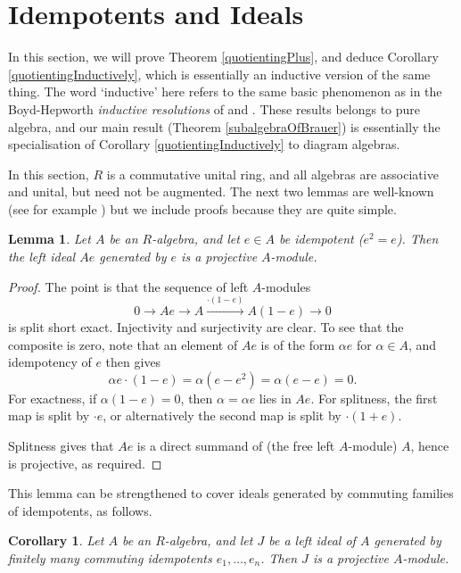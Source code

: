 \documentclass[12pt]{amsart}
\theoremstyle{plain}
\theoremstyle{definition} \newtheorem{definition}[theorem]{Definition}
\theoremstyle{plain}
\newtheorem{lemma}[theorem]{Lemma}
\theoremstyle{plain} \newtheorem{proposition}[theorem]{Proposition}
\theoremstyle{plain} \newtheorem{conjecture}[theorem]{Conjecture}
\theoremstyle{plain} \newtheorem{corollary}[theorem]{Corollary}
\theoremstyle{remark} \newtheorem{claim}[theorem]{Claim}
\theoremstyle{remark} \newtheorem{remark}[theorem]{Remark}
\theoremstyle{remark} \newtheorem{example}[theorem]{Example}
\theoremstyle{remark} \newtheorem{comment}[theorem]{Comment}
\theoremstyle{definition} \newtheorem{question}[theorem]{Question}
\begin{document}
\section{Idempotents and Ideals} \label{SectionIdempotents}

In this section, we will prove Theorem \ref{quotientingPlus}, and deduce Corollary \ref{quotientingInductively}, which is essentially an inductive version of the same thing. The word `inductive' here refers to the same basic phenomenon as in the Boyd-Hepworth \emph{inductive resolutions} of \cite{BH} and \cite{BHP}. These results belongs to pure algebra, and our main result (Theorem \ref{subalgebraOfBrauer}) is essentially the specialisation of Corollary \ref{quotientingInductively} to diagram algebras.

In this section, $R$ is a commutative unital ring, and all algebras are associative and unital, but need not be augmented. The next two lemmas are well-known (see for example \cite[Chapter 1, Exercise 2.4]{Liu}) but we include proofs because they are quite simple.

\begin{lemma} Let $A$ be an $R$-algebra, and let $e \in A$ be idempotent ($e^2=e$). Then the left ideal $A e$ generated by $e$ is a projective $A$-module. \label{singleIdempotent} \end{lemma} 

\begin{proof} The point is that the sequence of left $A$-modules $$0 \to Ae \to A \xrightarrow{\cdot(1-e)} A(1-e) \to 0$$ is split short exact. Injectivity and surjectivity are clear. To see that the composite is zero, note that an element of $Ae$ is of the form $\alpha e$ for $\alpha \in A$, and idempotency of $e$ then gives $$\alpha e \cdot (1-e) = \alpha (e - e^2) = \alpha (e-e)=0.$$ For exactness, if $\alpha(1-e)=0$, then $\alpha = \alpha e$ lies in $Ae$. For splitness, the first map is split by $\cdot e$, or alternatively the second map is split by $\cdot (1+e)$.

Splitness gives that $Ae$ is a direct summand of (the free left $A$-module) $A$, hence is projective, as required. 
\end{proof}

This lemma can be strengthened to cover ideals generated by commuting families of idempotents, as follows.

\begin{corollary} Let $A$ be an $R$-algebra, and let $J$ be a left ideal of $A$ generated by finitely many commuting idempotents $e_1, \dots, e_n$. Then $J$ is a projective $A$-module. \label{idempotency} \end{corollary}
\end{document}
